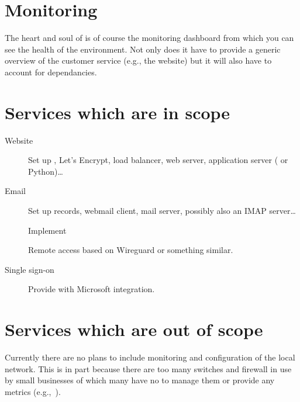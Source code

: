 \documentclass[a4paper,12pt]{scrartcl}
\begin{document}
\section{Monitoring}
The heart and soul of  is of course the monitoring dashboard from which you can see the health of the environment.
Not only does it have to provide a generic overview of the customer service (e.g., the website) but it will also have to account for dependancies.



\section{Services which are in scope}
\begin{description}
\item[Website]
    Set up , Let's Encrypt, load balancer, web server, application server ( or Python)\ldots
\item[Email]
    Set up  records, webmail client, mail server, possibly also an IMAP server\ldots
\item[]
    Implement 
\item[]
    Remote access  based on Wireguard or something similar.
\item[Single sign-on]
    Provide  with Microsoft  integration.
\end{description}




\section{Services which are out of scope}
Currently there are no plans to include monitoring and configuration of the local network.
This is in part because there are too many switches and firewall in use by small businesses of which many have no  to manage them or provide any metrics (e.g.,\ ).
\end{document}
